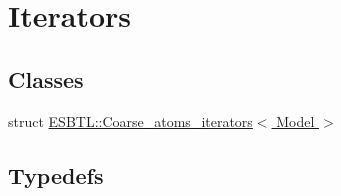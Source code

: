 \hypertarget{group__grp__iters}{}\section{Iterators}
\label{group__grp__iters}
\subsection*{Classes}
\begin{DoxyCompactItemize}
\item 
struct \hyperlink{structESBTL_1_1Coarse__atoms__iterators}{E\+S\+B\+T\+L\+::\+Coarse\+\_\+atoms\+\_\+iterators$<$ Model $>$}
\end{DoxyCompactItemize}
\subsection*{Typedefs}
